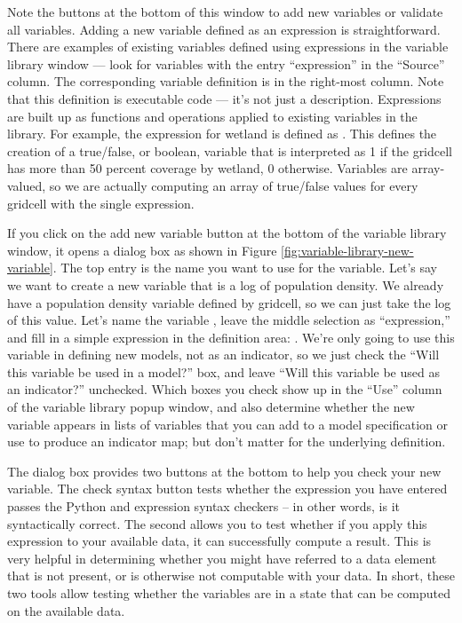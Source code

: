 Note the buttons at the bottom of this window to add new variables or
validate all variables.  Adding a new variable defined as an expression is
straightforward.  There are examples of existing variables defined using
expressions in the variable library window --- look for variables with the
entry ``expression'' in the ``Source'' column.  The corresponding variable
definition is in the right-most column.  Note that this definition is
executable code --- it's not just a description.  Expressions are built up
as functions and operations applied to existing variables in the library.
For example, the expression for wetland is defined as
.  This defines the creation of a
true/false, or boolean, variable that is interpreted as 1 if the gridcell
has more than 50 percent coverage by wetland, 0 otherwise.  Variables are
array-valued, so we are actually computing an array of true/false values
for every gridcell with the single expression.

If you click on the add new variable button at the bottom of the variable
library window, it opens a dialog box as shown in Figure
\ref{fig:variable-library-new-variable}.  The top entry is the name you
want to use for the variable.  Let's say we want to create a new variable
that is a log of population density.  We already have a population density
variable defined by gridcell, so we can just take the log of this value.
Let's name the variable , leave the middle
selection as ``expression,'' and fill in a simple expression in the
definition area: .  We're only
going to use this variable in defining new models, not as an indicator, so
we just check the ``Will this variable be used in a model?''  box, and
leave ``Will this variable be used as an indicator?'' unchecked.  Which
boxes you check show up in the ``Use'' column of the variable library
popup window, and also determine whether the new variable appears in 
lists of variables that you can add to a model specification or use to
produce an indicator map; but don't matter for the underlying definition.

The dialog box provides two buttons at the bottom to help you check your
new variable.  The check syntax button tests whether the expression you
have entered passes the Python and expression syntax checkers -- in other
words, is it syntactically correct.  The second allows you to test whether
if you apply this expression to your available data, it can successfully
compute a result.  This is very helpful in determining whether you might
have referred to a data element that is not present, or is otherwise not
computable with your data.  In short, these two tools allow testing whether
the variables are in a state that can be computed on the available data.


